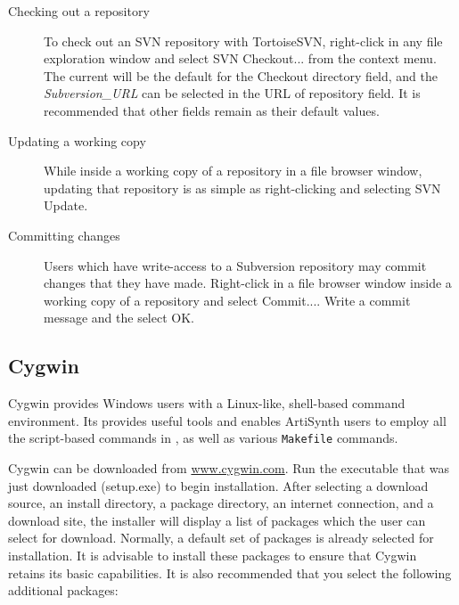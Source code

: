 \begin{description}

\item[Checking out a repository]

To check out an SVN repository with TortoiseSVN, right-click in any
file exploration window and select {\sf SVN Checkout...} from the
context menu. The current \directory{} will be the default \directory{} for
the {\sf Checkout directory} field, and the {\it Subversion\_URL} can
be selected in the {\sf URL of repository} field. It is recommended
that other fields remain as their default values.

\item[Updating a working copy]

While inside a working copy of a repository in a file browser window,
updating that repository is as simple as right-clicking and selecting
{\sf SVN Update}.

\item[Committing changes]

Users which have write-access to a Subversion repository may commit
changes that they have made.  Right-click in a file browser window
inside a working copy of a repository and select {\sf
Commit...}. Write a commit message and the select {\sf OK}.

\end{description}

\subsection{Cygwin}
\label{Cygwin}

Cygwin provides Windows users with a Linux-like, shell-based command
environment.  Its provides useful tools and enables ArtiSynth users to
employ all the script-based commands in , as well
as various {\tt Makefile} commands.

Cygwin can be downloaded from 
\href{http://www.cygwin.com}{www.cygwin.com}. Run the
executable that was just downloaded (setup.exe) to begin
installation. After selecting a download source, an install directory,
a package directory, an internet connection, and a download site, the
installer will display a list of packages which the user can select
for download. Normally, a default set of packages is already selected
for installation. It is advisable to install these packages to ensure
that Cygwin retains its basic capabilities. It is also recommended
that you select the following additional packages:

